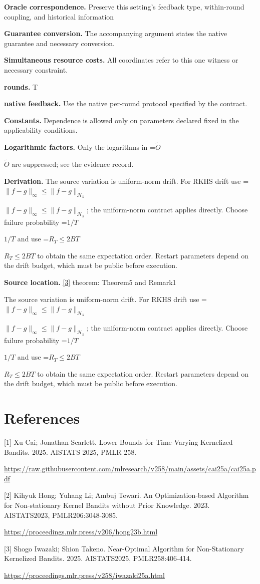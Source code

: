 \documentclass[10pt,a4paper]{article}
\newcommand{\AtlasMath}[1]{\par\begingroup\centering\setbox0=\hbox{$\displaystyle #1$}\ifdim\wd0>1.4\linewidth\typeout{ATLAS WIDE FORMULA: \the\wd0}\fi\ifdim\wd0>\linewidth\resizebox{\linewidth}{!}{\box0}\else\box0\fi\par\endgroup}
\newcommand{\AtlasInlineMath}[1]{\begingroup\setbox0=\hbox{$#1$}\ifdim\wd0>.4\linewidth\endgroup\AtlasMath{#1}\else\endgroup$#1$\fi}
\begin{document}
\textbf{Oracle correspondence.} Preserve this setting's feedback type, within-round coupling, and historical information

\textbf{Guarantee conversion.} The accompanying argument states the native guarantee and necessary conversion.

\textbf{Simultaneous resource costs.} All coordinates refer to this one witness or necessary constraint.

\textbf{rounds.} T

\textbf{native feedback.} Use the native per-round protocol specified by the contract.

\textbf{Constants.} Dependence is allowed only on parameters declared fixed in the applicability conditions.

\textbf{Logarithmic factors.} Only the logarithms in \AtlasInlineMath{\widetilde O} are suppressed; see the evidence record.

\textbf{Derivation.} The source variation is uniform-norm drift. For RKHS drift use \AtlasInlineMath{\|f-g\|_\infty\le\|f-g\|_{\mathcal H_k}}; the uniform-norm contract applies directly. Choose failure probability \AtlasInlineMath{1/T} and use \AtlasInlineMath{R_T\le2BT} to obtain the same expectation order. Restart parameters depend on the drift budget, which must be public before execution.

\textbf{Source location.} \href{https://proceedings.mlr.press/v258/iwazaki25a.html}{[3]} theorem: Theorem5 and Remark1

The source variation is uniform-norm drift. For RKHS drift use \AtlasInlineMath{\|f-g\|_\infty\le\|f-g\|_{\mathcal H_k}}; the uniform-norm contract applies directly. Choose failure probability \AtlasInlineMath{1/T} and use \AtlasInlineMath{R_T\le2BT} to obtain the same expectation order. Restart parameters depend on the drift budget, which must be public before execution.

\section{References}
[1] Xu Cai; Jonathan Scarlett. Lower Bounds for Time-Varying Kernelized Bandits. 2025. AISTATS 2025, PMLR 258.

\url{https://raw.githubusercontent.com/mlresearch/v258/main/assets/cai25a/cai25a.pdf}

[2] Kihyuk Hong; Yuhang Li; Ambuj Tewari. An Optimization-based Algorithm for Non-stationary Kernel Bandits without Prior Knowledge. 2023. AISTATS2023, PMLR206:3048-3085.

\url{https://proceedings.mlr.press/v206/hong23b.html}

[3] Shogo Iwazaki; Shion Takeno. Near-Optimal Algorithm for Non-Stationary Kernelized Bandits. 2025. AISTATS2025, PMLR258:406-414.

\url{https://proceedings.mlr.press/v258/iwazaki25a.html}
\end{document}
